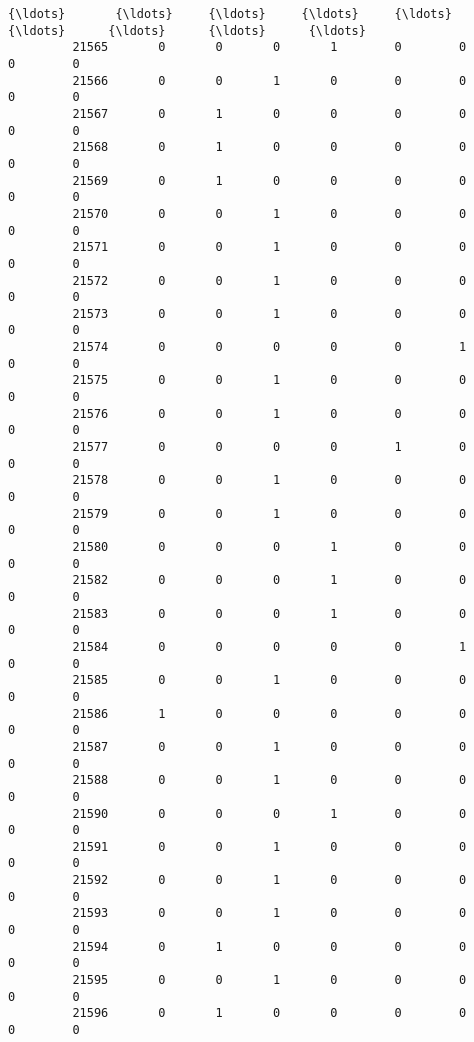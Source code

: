\documentclass[11pt]{article}
\begin{document}
\begin{Verbatim}[commandchars=\\\{\}]
         {\ldots}       {\ldots}     {\ldots}     {\ldots}     {\ldots}      {\ldots}      {\ldots}      {\ldots}      {\ldots}   
         21565       0       0       0       1        0        0        0        0   
         21566       0       0       1       0        0        0        0        0   
         21567       0       1       0       0        0        0        0        0   
         21568       0       1       0       0        0        0        0        0   
         21569       0       1       0       0        0        0        0        0   
         21570       0       0       1       0        0        0        0        0   
         21571       0       0       1       0        0        0        0        0   
         21572       0       0       1       0        0        0        0        0   
         21573       0       0       1       0        0        0        0        0   
         21574       0       0       0       0        0        1        0        0   
         21575       0       0       1       0        0        0        0        0   
         21576       0       0       1       0        0        0        0        0   
         21577       0       0       0       0        1        0        0        0   
         21578       0       0       1       0        0        0        0        0   
         21579       0       0       1       0        0        0        0        0   
         21580       0       0       0       1        0        0        0        0   
         21582       0       0       0       1        0        0        0        0   
         21583       0       0       0       1        0        0        0        0   
         21584       0       0       0       0        0        1        0        0   
         21585       0       0       1       0        0        0        0        0   
         21586       1       0       0       0        0        0        0        0   
         21587       0       0       1       0        0        0        0        0   
         21588       0       0       1       0        0        0        0        0   
         21590       0       0       0       1        0        0        0        0   
         21591       0       0       1       0        0        0        0        0   
         21592       0       0       1       0        0        0        0        0   
         21593       0       0       1       0        0        0        0        0   
         21594       0       1       0       0        0        0        0        0   
         21595       0       0       1       0        0        0        0        0   
         21596       0       1       0       0        0        0        0        0   
         

\end{Verbatim}
\end{document}
